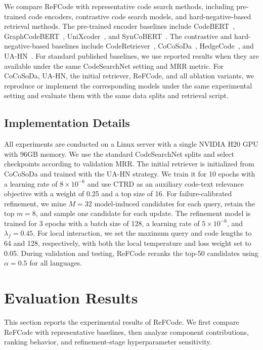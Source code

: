 \documentclass[10pt,conference]{IEEEtran}
\newcommand{\method}{ReFCode}
\begin{document}
We compare \method{} with representative code search methods, including pre-trained code encoders, contrastive code search models, and hard-negative-based retrieval methods. The pre-trained encoder baselines include CodeBERT~\cite{CodeBERT}, GraphCodeBERT~\cite{GraphCodeBERT}, UniXcoder~\cite{UniXcoder}, and SynCoBERT~\cite{SynCoBERT}. The contrastive and hard-negative-based baselines include CodeRetriever~\cite{CodeRetriever}, CoCoSoDa~\cite{CoCoSoDa}, HedgeCode~\cite{HedgeCode}, and UA-HN~\cite{AAAIUA}. For standard published baselines, we use reported results when they are available under the same CodeSearchNet setting and MRR metric. For CoCoSoDa, UA-HN, the initial retriever, \method{}, and all ablation variants, we reproduce or implement the corresponding models under the same experimental setting and evaluate them with the same data splits and retrieval script.

\subsection{Implementation Details}
\label{sec:impl}

All experiments are conducted on a Linux server with a single NVIDIA H20 GPU with 96GB memory. We use the standard CodeSearchNet splits and select checkpoints according to validation MRR. The initial retriever is initialized from CoCoSoDa and trained with the UA-HN strategy. We train it for 10 epochs with a learning rate of \(8 \times 10^{-6}\) and use CTRD as an auxiliary code-text relevance objective with a weight of 0.25 and a top size of 16. For failure-calibrated refinement, we mine \(M=32\) model-induced candidates for each query, retain the top \(m=8\), and sample one candidate for each update. 
The refinement model is trained for 3 epochs with a batch size of 128, a learning rate of \(5 \times 10^{-6}\), and \(\lambda_f=0.45\). 
For local interaction, we set the maximum query and code lengths to 64 and 128, respectively, with both the local temperature and loss weight set to 0.05. 
During validation and testing, ReFCode reranks the top-50 candidates using \(\alpha=0.5\) for all languages.

\section{Evaluation Results}
\label{sec:evaluation_results}

This section reports the experimental results of \method{}. We first compare \method{} with representative baselines, then analyze component contributions, ranking behavior, and refinement-stage hyperparameter sensitivity.
\end{document}

